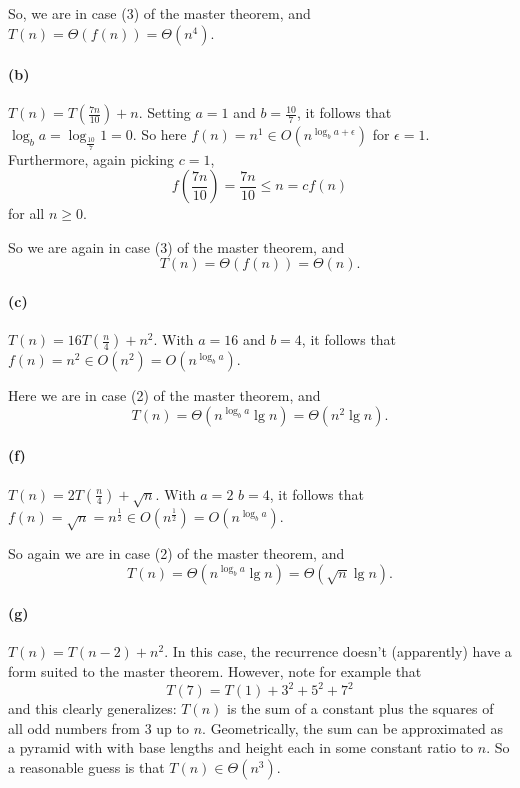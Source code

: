 \documentclass[
]{article}
\begin{document}
So, we are in case (3) of the master theorem, and
\(T(n) = \Theta(f(n)) = \Theta(n^4)\).

\hypertarget{b-4}{%
\paragraph{(b)}\label{b-4}}

\(T(n) = T(\frac{7n}{10}) + n\). Setting \(a=1\) and \(b=\frac{10}{7}\),
it follows that \(\log_ba=\log_{\frac{10}{7}}1 = 0\). So here
\(f(n) = n^1 \in O(n^{\log_b a + \epsilon})\) for \(\epsilon = 1\).
Furthermore, again picking \(c=1\), \begin{equation*}
  f\left(\frac{7n}{10}\right)=\frac{7n}{10}\leq n = cf(n)
\end{equation*} for all \(n\geq 0\).

So we are again in case (3) of the master theorem, and
\[
T(n) = \Theta(f(n))=\Theta(n).
\]

\hypertarget{c-3}{%
\paragraph{(c)}\label{c-3}}

\(T(n) = 16T(\frac{n}{4}) + n^2\). With \(a=16\) and \(b=4\), it follows that
\(f(n)=n^2\in O(n^2)=O(n^{\log_b a})\).

Here we are in case (2) of the master theorem, and
\[
T(n)=\Theta(n^{\log_b a}\lg n)=\Theta(n^2\lg n).
\]

\hypertarget{f}{%
\paragraph{(f)}\label{f}}

\(T(n) = 2T(\frac{n}{4}) + \sqrt n\). With \(a=2\) \(b=4\), it follows that
\(f(n)=\sqrt{n} = n^{\frac{1}{2}}\in O(n^{\frac{1}{2}})=O(n^{\log_b a})\).

So again we are in case (2) of the master theorem, and
\[
T(n)=\Theta(n^{\log_b a}\lg n)=\Theta(\sqrt{n}\lg n).
\]


\hypertarget{g}{%
\paragraph{(g)}\label{g}}

\(T(n) = T(n-2) + n^2\). In this case, the recurrence doesn't (apparently) have a
form suited to the master theorem. However, note for example that
\begin{equation*}
T(7) = T(1) + 3^2 + 5^2 + 7^2  
\end{equation*} and this clearly generalizes: \(T(n)\) is the sum of a
constant plus the squares of all odd numbers from \(3\) up to \(n\).
Geometrically, the sum can be approximated as a pyramid with with base
lengths and height each in some constant ratio to \(n\). So a reasonable
guess is that \(T(n) \in \Theta(n^3)\).
\end{document}
